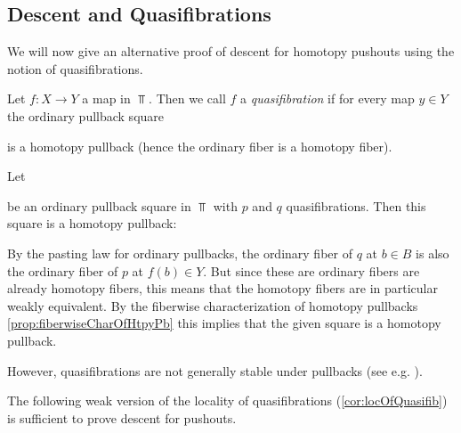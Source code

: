 \subsection*{Descent and Quasifibrations}
We will now give an alternative proof of descent for homotopy pushouts using the notion of quasifibrations.
\begin{definition}[Quasifibration]
    Let $f\colon X\to Y$ a map in $\Top$.
    Then we call $f$ a \emph{quasifibration} if for every map $y\in Y$ the ordinary pullback square
    \begin{center}
    \end{center}
    is a homotopy pullback (hence the ordinary fiber is a homotopy fiber).
\end{definition}
\begin{remark}\label{rmk:parallelQuasifibsInPb}
    Let 
    \begin{center}
    \end{center}
    be an ordinary pullback square in $\Top$ with $p$ and $q$ quasifibrations.
    Then this square is a homotopy pullback:
    
    By the pasting law for ordinary pullbacks, the ordinary fiber of $q$ at $b\in B$ is also the ordinary fiber of $p$ at $f(b)\in Y$.
    But since these are ordinary fibers are already homotopy fibers, this means that the homotopy fibers are in particular weakly equivalent.
    By the fiberwise characterization of homotopy pullbacks \cref{prop:fiberwiseCharOfHtpyPb} this implies that the given square is a homotopy pullback.

    However, quasifibrations are not generally stable under pullbacks (see e.g. \cite[Example 2.7.6]{cubical_htpy_theory}).
\end{remark}
The following weak version of the locality of quasifibrations (\cref{cor:locOfQuasifib}) is sufficient to prove descent for pushouts.
